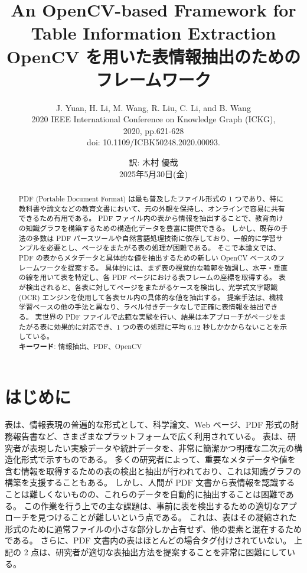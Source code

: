 \documentclass[uplatex, twocolumn,10pt]{jsarticle}
\begin{document}
\title{
    \bf{
        \LARGE{An OpenCV-based Framework for Table Information Extraction} \\
        \Large{OpenCV を用いた表情報抽出のためのフレームワーク}
    }
}
\author{J. Yuan, H. Li, M. Wang, R. Liu, C. Li, and B. Wang \\
    2020 IEEE International Conference on Knowledge Graph (ICKG), \\
    2020, pp.621-628 \\
    doi: 10.1109/ICBK50248.2020.00093.}
\date{訳: 木村 優哉 \\ 2025年5月30日(金)}

\maketitle


\begin{abstract}
    PDF (Portable Document Format) は最も普及したファイル形式の 1 つであり、特に教科書や論文などの教育文書において、元の外観を保持し、オンラインで容易に共有できるため有用である。
    PDF ファイル内の表から情報を抽出することで、教育向けの知識グラフを構築するための構造化データを豊富に提供できる。
    しかし、既存の手法の多数は PDF パースツールや自然言語処理技術に依存しており、一般的に学習サンプルを必要とし、ページをまたがる表の処理が困難である。
    そこで本論文では、PDF の表からメタデータと具体的な値を抽出するための新しい OpenCV ベースのフレームワークを提案する。
    具体的には、まず表の視覚的な輪郭を強調し、水平・垂直の線を用いて表を特定し、各 PDF ページにおける表フレームの座標を取得する。
    表が検出されると、各表に対してページをまたがるケースを検出し、光学式文字認識 (OCR) エンジンを使用して各表セル内の具体的な値を抽出する。
    提案手法は、機械学習ベースの他の手法と異なり、ラベル付きデータなしで正確に表情報を抽出できる。
    実世界の PDF ファイルで広範な実験を行い、結果は本アプローチがページをまたがる表に効果的に対応でき、1 つの表の処理に平均 6.12 秒しかかからないことを示している。\\
    \textbf{キーワード}: 情報抽出、PDF、OpenCV
\end{abstract}



\section{はじめに}

表は、情報表現の普遍的な形式として、科学論文、Web ページ、PDF 形式の財務報告書など、さまざまなプラットフォームで広く利用されている。
表は、研究者が表現したい実験データや統計データを、非常に簡潔かつ明確な二次元の構造化形式で示すものである。
多くの研究者によって、重要なメタデータや値を含む情報を取得するための表の検出と抽出が行われており、これは知識グラフの構築を支援することもある。
しかし、人間が PDF 文書から表情報を認識することは難しくないものの、これらのデータを自動的に抽出することは困難である。
この作業を行う上での主な課題は、事前に表を検出するための適切なアプローチを見つけることが難しいという点である。
これは、表はその凝縮された形式のために通常ファイルの小さな部分しか占有せず、他の要素と混在するためである。
さらに、PDF 文書内の表はほとんどの場合タグ付けされていない。
上記の 2 点は、研究者が適切な表抽出方法を提案することを非常に困難にしている。
\end{document}

